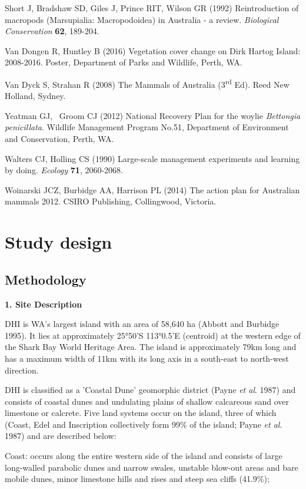 \documentclass[version=last,
    paper=a4,                               %
    10pt,                                   %
    dvipsnames,
    oneside,                              %
    headings=openany,                       %
    open=any,
    BCOR=7mm,                               %
    DIV=15,     %
]{scrbook}
\begin{document}
Short J, Bradshaw SD, Giles J, Prince RIT, Wilson GR (1992)
Reintroduction of macropods (Marsupialia: Macropodoidea) in Australia -
a review. \emph{Biological Conservation} \textbf{62}, 189-204.

Van Dongen R, Huntley B (2016) Vegetation cover change on Dirk Hartog
Island: 2008-2016. Poster, Department of Parks and Wildlife, Perth, WA.

Van Dyck S, Strahan R (2008) The Mammals of Australia
(3\textsuperscript{rd} Ed). Reed New Holland, Sydney.

Yeatman GJ,~ Groom CJ (2012) National Recovery Plan for the woylie
\emph{Bettongia penicillata}. Wildlife Management Program No.51,
Department of Environment and Conservation, Perth, WA.

Walters CJ, Holling CS (1990) Large-scale management experiments and
learning by doing. \emph{Ecology} \textbf{71}, 2060-2068.

Woinarski JCZ, Burbidge AA, Harrison PL (2014) The action plan for
Australian mammals 2012. CSIRO Publishing, Collingwood, Victoria.



\section*{Study design}


\subsection*{Methodology}

\textbf{1. Site Description}

DHI is WA's largest island with an area of 58,640 ha (Abbott and
Burbidge 1995). It lies at approximately 25°50'S 113°0.5'E (centroid) at
the western edge of the Shark Bay World Heritage Area. The island is
approximately 79km long and has a maximum width of 11km with its long
axis in a south-east to north-west direction.

DHI is classified as a 'Coastal Dune' geomorphic district (Payne
\emph{et al}. 1987) and consists of coastal dunes and undulating plains
of shallow calcareous sand over limestone or calcrete. Five land systems
occur on the island, three of which (Coast, Edel and Inscription
collectively form 99\% of the island; Payne \emph{et al}. 1987) and are
described below:

Coast: occurs along the entire western side of the island and consists
of large long-walled parabolic dunes and narrow swales, unstable
blow-out areas and bare mobile dunes, minor limestone hills and rises
and steep sea cliffs (41.9\%);
\end{document}
